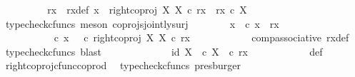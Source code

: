 \begin{isabellebody}
\ \ \ \ \ \ \isamarkupfalse%
\ \isamarkupfalse%
\ rx\ \ rx{\isacharunderscore}{\kern0pt}def{\isacharcolon}{\kern0pt}\ {\isachardoublequoteopen}x\ {\isacharequal}{\kern0pt}\ right{\isacharunderscore}{\kern0pt}coproj\ X\ X\ {\isasymcirc}\isactrlsub c\ rx\ {\isasymand}\ rx\ {\isasymin}\isactrlsub c\ X{\isachardoublequoteclose}\isanewline
\ \ \ \ \ \ \ \ \isamarkupfalse%
\ {\isacharparenleft}{\kern0pt}typecheck{\isacharunderscore}{\kern0pt}cfuncs{\isacharcomma}{\kern0pt}\ meson\ coprojs{\isacharunderscore}{\kern0pt}jointly{\isacharunderscore}{\kern0pt}surj{\isacharparenright}{\kern0pt}\isanewline
\ \ \ \ \ \ \isamarkupfalse%
\ {\isasymrho}x{\isacharcolon}{\kern0pt}\ {\isachardoublequoteopen}{\isasymrho}\ {\isasymcirc}\isactrlsub c\ x\ {\isacharequal}{\kern0pt}\ {\isasymlangle}rx{\isacharcomma}{\kern0pt}\ {\isasymf}{\isasymrangle}{\isachardoublequoteclose}\isanewline
\ \ \ \ \ \ \isamarkupfalse%
\ {\isacharminus}{\kern0pt}\ \isanewline
\ \ \ \ \ \ \ \ \isamarkupfalse%
\ {\isachardoublequoteopen}{\isasymrho}\ {\isasymcirc}\isactrlsub c\ x\ {\isacharequal}{\kern0pt}\ {\isacharparenleft}{\kern0pt}{\isasymrho}\ {\isasymcirc}\isactrlsub c\ right{\isacharunderscore}{\kern0pt}coproj\ X\ X{\isacharparenright}{\kern0pt}\ {\isasymcirc}\isactrlsub c\ rx{\isachardoublequoteclose}\isanewline
\ \ \ \ \ \ \ \ \ \ \isamarkupfalse%
\ comp{\isacharunderscore}{\kern0pt}associative{}\ rx{\isacharunderscore}{\kern0pt}def\ \isamarkupfalse%
\ {\isacharparenleft}{\kern0pt}typecheck{\isacharunderscore}{\kern0pt}cfuncs{\isacharcomma}{\kern0pt}\ blast{\isacharparenright}{\kern0pt}\isanewline
\ \ \ \ \ \ \ \ \isamarkupfalse%
\ \isamarkupfalse%
\ {\isachardoublequoteopen}{\isachardot}{\kern0pt}{\isachardot}{\kern0pt}{\isachardot}{\kern0pt}\ {\isacharequal}{\kern0pt}\ {\isasymlangle}id\ X{\isacharcomma}{\kern0pt}\ {\isasymf}\ {\isasymcirc}\isactrlsub c\ {\isasymbeta}\isactrlbsub X\isactrlesub {\isasymrangle}\ \ {\isasymcirc}\isactrlsub c\ rx{\isachardoublequoteclose}\isanewline
\ \ \ \ \ \ \ \ \ \ \isamarkupfalse%
\ {\isasymrho}{\isacharunderscore}{\kern0pt}def\ \ \isamarkupfalse%
\ right{\isacharunderscore}{\kern0pt}coproj{\isacharunderscore}{\kern0pt}cfunc{\isacharunderscore}{\kern0pt}coprod\ \isamarkupfalse%
\ {\isacharparenleft}{\kern0pt}typecheck{\isacharunderscore}{\kern0pt}cfuncs{\isacharcomma}{\kern0pt}\ presburger{\isacharparenright}{\kern0pt}\isanewline

\end{isabellebody}
